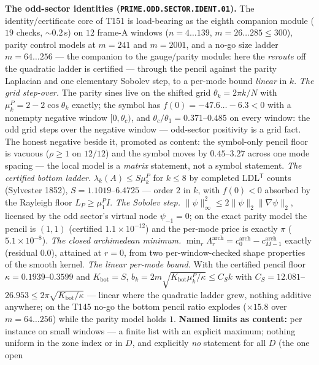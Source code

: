 \documentclass[11pt,a4paper]{article}
\theoremstyle{definition}
\begin{document}
\par\smallskip\noindent\textbf{The odd-sector identities
(\texttt{PRIME.ODD.SECTOR.IDENT.01}).}
The identity/certificate core of T151 is load-bearing as the eighth
companion module ($19$ checks, ${\sim}0.2$\,s) on $12$ frame-A windows
($n=4\ldots139$, $m=26\ldots285\le300$), parity control models at $m=241$
and $m=2001$, and a no-go size ladder $m=64\ldots256$ --- the companion to
the gauge/parity module: here the \emph{reroute} off the quadratic ladder
is certified --- through the pencil against the parity Laplacian and one
elementary Sobolev step, to a per-mode bound \emph{linear} in $k$.
\emph{The grid step-over.} The parity sines live on the shifted grid
$\theta_k=2\pi k/N$ with $\mu^P_k=2-2\cos\theta_k$ exactly; the symbol has
$f(0)=-47.6\ldots-6.3<0$ with a nonempty negative window $[0,\theta_c)$,
and $\theta_c/\theta_1=0.371$--$0.485$ on every window: the odd grid steps
over the negative window --- odd-sector positivity is a grid fact. The
honest negative beside it, promoted as content: the symbol-only pencil
floor is vacuous ($\rho\ge1$ on $12/12$) and the symbol moves by
$0.45$--$3.27$ across one mode spacing --- the local model is a
\emph{matrix} statement, not a symbol statement.
\emph{The certified bottom ladder.} $\lambda_k(A)\le S\mu^P_k$ for $k\le8$
by completed LDL$^{\mathsf T}$ counts (Sylvester 1852), $S=1.1019$--$6.4725$
--- order $2$ in $k$, with $f(0)<0$ absorbed by the Rayleigh floor
$L_P\ge\mu^P_1I$.
\emph{The Sobolev step.} $\|\psi\|_\infty^2\le2\|\psi\|_2\|\nabla\psi\|_2$,
licensed by the odd sector's virtual node $\psi_{-1}=0$; on the exact
parity model the pencil is $(1,1)$ (certified $1.1\times10^{-12}$) and the
per-mode price is exactly $\pi$ ($5.1\times10^{-8}$).
\emph{The closed archimedean minimum.}
$\min_r\Lambda^{\mathrm{arch}}_r=c^{\mathrm{arch}}_0-c^{\mathrm{arch}}_{M-1}$
exactly (residual $0.0$), attained at $r=0$, from two per-window-checked
shape properties of the smooth kernel.
\emph{The linear per-mode bound.} With the certified pencil floor
$\kappa=0.1939$--$0.3599$ and $K_{\mathrm{bot}}=S$,
$b_k=2m\sqrt{K_{\mathrm{bot}}\mu^P_k/\kappa}\le C_Sk$ with
$C_S=12.081$--$26.953\le2\pi\sqrt{K_{\mathrm{bot}}/\kappa}$ --- linear
where the quadratic ladder grew, nothing additive anywhere; on the T145
no-go the bottom pencil ratio explodes ($\times15.8$ over $m=64\ldots256$)
while the parity model holds $1$.
\textbf{Named limits as content:} per instance on small windows --- a
finite list with an explicit maximum; nothing uniform in the zone index or
in $D$, and explicitly \emph{no} statement for all $D$ (the one open
\end{document}
